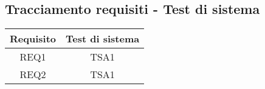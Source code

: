 \subsection{Tracciamento requisiti - Test di sistema}

\begin{center}
	\begin{longtable}{|c|c|}
	\hline
	\rowcolor{lighter-grayer}
	\textbf{Requisito} & \textbf{Test di sistema} \\
	\hline
	\endfirsthead


	
	\hline
	REQ1 & TSA1  \\
	REQ2 & TSA1 \\

	\hline

	\end{longtable}
\end{center}


